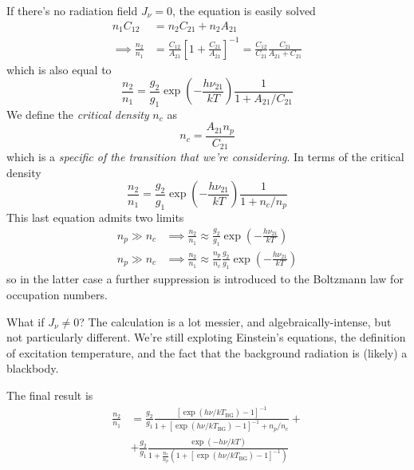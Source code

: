 If there's no radiation field $J_{\nu} = 0$, the equation is easily solved 
\begin{align*}
    n_{1}C_{12} &= n_{2}C_{21}+n_{2}A_{21}\\
    \implies \frac{n_{2}}{n_{1}} &= \frac{C_{12}}{A_{21}}\left[1+\frac{C_{21}}{A_{21}}\right]^{-1} = \frac{C_{12}}{C_{21}}\frac{C_{21}}{A_{21}+C_{21}}
\end{align*}
which is also equal to 
\begin{equation}
    \frac{n_{2}}{n_{1}} = \frac{g_{2}}{g_{1}}\exp\left(-\frac{h\nu_{21}}{kT}\right)\frac{1}{1+A_{21}/C_{21}}
\end{equation}
We define the \emph{critical density} $n_{c}$ as 
\begin{equation}
    n_{c} = \frac{A_{21}n_{p}}{C_{21}}
    \label{eq:criticaldensity}
\end{equation}
which is a \emph{specific of the transition that we're considering}. In terms of the critical density 
\begin{equation}
    \frac{n_{2}}{n_{1}} = \frac{g_{2}}{g_{1}}\exp\left(-\frac{h\nu_{21}}{kT}\right)\frac{1}{1+n_{c}/n_{p}}
\end{equation}
This last equation admits two limits 
\begin{align}
    n_{p} \gg n_{c} &\implies  \frac{n_{2}}{n_{1}} \approx \frac{g_{2}}{g_{1}}\exp\left(-\frac{h\nu_{21}}{kT}\right)\\
    n_{p} \gg n_{c} &\implies  \frac{n_{2}}{n_{1}} \approx \frac{n_{p}}{n_{c}}\frac{g_{2}}{g_{1}}\exp\left(-\frac{h\nu_{21}}{kT}\right)
\end{align}
so in the latter case a further suppression is introduced to the Boltzmann law for occupation numbers.
\par What if $J_{\nu} \neq 0$? The calculation is a lot messier, and algebraically-intense, but not particularly different. We're still exploting Einstein's equations, the definition of excitation temperature, and the fact that the background radiation is (likely) a blackbody. 
\par The final result is 
\begin{align*}
    \frac{n_{2}}{n_{1}} &= \frac{g_{2}}{g_{1}}\frac{\left[\exp(h\nu/kT_{\text{BG}})-1\right]^{-1}}{1+\left[\exp(h\nu/kT_{\text{BG}})-1\right]^{-1}+n_{p}/n_{c}} + \\
    &+ \frac{g_{2}}{g_{1}}\frac{\exp\left(-h\nu/kT\right)}{1+\frac{n_{c}}{n_{p}}\left(1+\left[\exp(h\nu/kT_{\text{BG}})-1\right]^{-1}\right)}
\end{align*}
